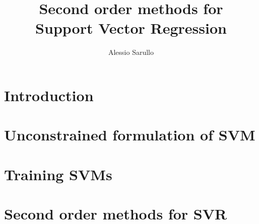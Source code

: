 \documentclass[english,laurea,twoside,10pt]{UFtesi}
\title{Second order methods for \\ \vspace{0.3em}Support Vector Regression}
\author{Alessio Sarullo}
\date{}
\begin{document}
\maketitle
\frontmatter



\tableofcontents
\mainmatter
\chapter{Introduction}

\chapter{Unconstrained formulation of SVM}

\chapter{Training SVMs}

\chapter{Second order methods for SVR}


\nocite{*}		 %
{}

\end{document}
